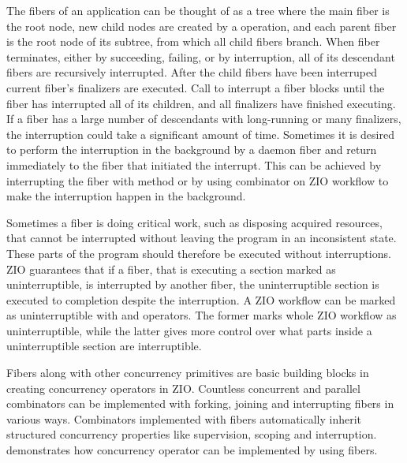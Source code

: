 The fibers of an application can be thought of as a tree where the main fiber is the root node, new child nodes are created by a  operation, and each parent fiber is the root node of its subtree, from which all child fibers branch. When fiber terminates, either by succeeding, failing, or by interruption, all of its descendant fibers are recursively interrupted. After the child fibers have been interruped current fiber's finalizers are executed. Call to interrupt a fiber blocks until the fiber has interrupted all of its children, and all finalizers have finished executing. If a fiber has a large number of descendants with long-running or many finalizers, the interruption could take a significant amount of time. Sometimes it is desired to perform the interruption in the background by a daemon fiber and return immediately to the fiber that initiated the interrupt. This can be achieved by interrupting the fiber with  method or by using  combinator on ZIO workflow to make the interruption happen in the background.

Sometimes a fiber is doing critical work, such as disposing acquired resources, that cannot be interrupted without leaving the program in an inconsistent state. These parts of the program should therefore be executed without interruptions. ZIO guarantees that if a fiber, that is executing a section marked as uninterruptible, is interrupted by another fiber, the uninterruptible section is executed to completion despite the interruption. A ZIO workflow can be marked as uninterruptible with  and  operators. The former marks whole ZIO workflow as uninterruptible, while the latter gives more control over what parts inside a uninterruptible section are interruptible.

Fibers along with other concurrency primitives are basic building blocks in creating concurrency operators in ZIO. Countless concurrent and parallel combinators can be implemented with forking, joining and interrupting fibers in various ways. Combinators implemented with fibers automatically inherit structured concurrency properties like supervision, scoping and interruption.  demonstrates how  concurrency operator can be implemented by using fibers.



